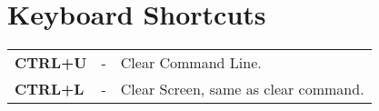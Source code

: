 \chapter{Keyboard Shortcuts}
	\begin{tabular}{lcl}
		\textbf{CTRL+U} &- &Clear Command Line. \\
		\textbf{CTRL+L} &- &Clear Screen, same as clear command. \\
	\end{tabular}